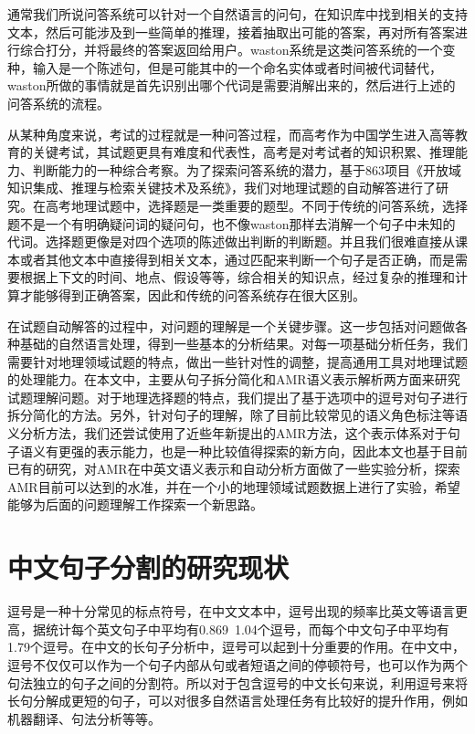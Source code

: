 \documentclass[master, winfont]{njuthesis}
\begin{document}
通常我们所说问答系统可以针对一个自然语言的问句，在知识库中找到相关的支持文本，然后可能涉及到一些简单的推理，接着抽取出可能的答案，再对所有答案进行综合打分，并将最终的答案返回给用户。waston系统是这类问答系统的一个变种，输入是一个陈述句，但是可能其中的一个命名实体或者时间被代词替代，waston所做的事情就是首先识别出哪个代词是需要消解出来的，然后进行上述的问答系统的流程\cite{Ferrucci2010}。

从某种角度来说，考试的过程就是一种问答过程，而高考作为中国学生进入高等教育的关键考试，其试题更具有难度和代表性，高考是对考试者的知识积累、推理能力、判断能力的一种综合考察。为了探索问答系统的潜力，基于863项目《开放域知识集成、推理与检索关键技术及系统》，我们对地理试题的自动解答进行了研究。在高考地理试题中，选择题是一类重要的题型。不同于传统的问答系统，选择题不是一个有明确疑问词的疑问句，也不像waston那样去消解一个句子中未知的代词。选择题更像是对四个选项的陈述做出判断的判断题。并且我们很难直接从课本或者其他文本中直接得到相关文本，通过匹配来判断一个句子是否正确，而是需要根据上下文的时间、地点、假设等等，综合相关的知识点，经过复杂的推理和计算才能够得到正确答案，因此和传统的问答系统存在很大区别。

在试题自动解答的过程中，对问题的理解是一个关键步骤。这一步包括对问题做各种基础的自然语言处理，得到一些基本的分析结果。对每一项基础分析任务，我们需要针对地理领域试题的特点，做出一些针对性的调整，提高通用工具对地理试题的处理能力。在本文中，主要从句子拆分简化和AMR语义表示解析两方面来研究试题理解问题。对于地理选择题的特点，我们提出了基于选项中的逗号对句子进行拆分简化的方法。另外，针对句子的理解，除了目前比较常见的语义角色标注等语义分析方法，我们还尝试使用了近些年新提出的AMR方法，这个表示体系对于句子语义有更强的表示能力，也是一种比较值得探索的新方向，因此本文也基于目前已有的研究，对AMR在中英文语义表示和自动分析方面做了一些实验分析，探索AMR目前可以达到的水准，并在一个小的地理领域试题数据上进行了实验，希望能够为后面的问题理解工作探索一个新思路。

\section{中文句子分割的研究现状}
\label{section:imtnow}
逗号是一种十分常见的标点符号，在中文文本中，逗号出现的频率比英文等语言更高，据统计每个英文句子中平均有0.869~1.04个逗号，而每个中文句子中平均有1.79个逗号\cite{Jin2004}。在中文的长句子分析中，逗号可以起到十分重要的作用。在中文中，逗号不仅仅可以作为一个句子内部从句或者短语之间的停顿符号\cite{Li2004}，也可以作为两个句法独立的句子之间的分割符\cite{Xu2013}\cite{Xue2011}。所以对于包含逗号的中文长句来说，利用逗号来将长句分解成更短的句子，可以对很多自然语言处理任务有比较好的提升作用，例如机器翻译\cite{Wang2014}、句法分析\cite{Jin2004}\cite{2007}\cite{Kong2014}\cite{Li2004}\cite{Li2008}等等。
\end{document}

